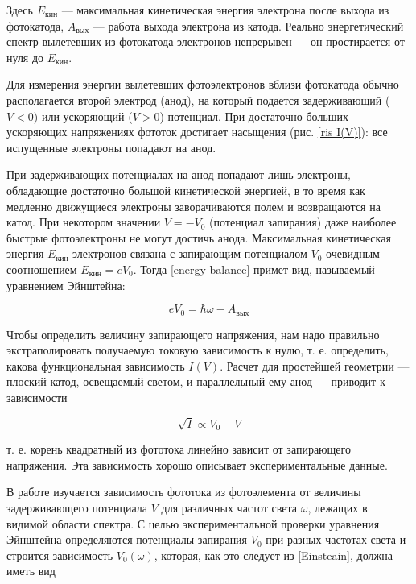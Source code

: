 \documentclass[a4paper,12pt]{article}
\theoremstyle{definition}
\begin{document}
	Здесь $E_{\text{кин}}$ ---  максимальная кинетическая энергия электрона после выхода из фотокатода, $A_{\text{вых}}$ --- работа выхода электрона из катода. Реально энергетический спектр вылетевших из фотокатода электронов непрерывен --- он простирается от нуля до $ E_{\text{кин}} $. 
	
	Для измерения энергии вылетевших фотоэлектронов вблизи фотокатода
	обычно располагается второй электрод
	(анод), на который подается задерживающий ($ V < 0 $) или ускоряющий ($ V >
	0 $) потенциал. При достаточно больших
	ускоряющих напряжениях фототок достигает насыщения (рис. \ref{ris I(V)}): все испущенные электроны попадают на анод.
	
	При задерживающих потенциалах на анод попадают лишь электроны,
	обладающие достаточно большой кинетической энергией, в то время
	как медленно движущиеся электроны заворачиваются полем и возвращаются на катод. При некотором значении $ V = -V_0 $ (потенциал запирания) даже наиболее быстрые фотоэлектроны не могут достичь
	анода.
	Максимальная кинетическая энергия $E_{\text{кин}}$ электронов связана с
	запирающим потенциалом $ V_0 $ очевидным соотношением $ E_{\text{кин}} = eV_0 $. Тогда \eqref{energy balance} примет вид, называемый уравнением Эйнштейна:
	
	\begin{equation}\label{Einsteain}
	eV_0 = \hbar\omega - A_{\text{вых}}
	\end{equation}
	
	Чтобы определить величину запирающего
	напряжения, нам надо правильно экстраполировать получаемую токовую зависимость к нулю, т. е. определить, какова функциональная
	зависимость $ I(V) $. Расчет для простейшей геометрии --- плоский катод, освещаемый светом, и параллельный ему анод --- приводит к зависимости
	
	\begin{equation}\label{sqrt I = V}
	\sqrt{I} \propto V_0 - V
	\end{equation}
	
	т. е. корень квадратный из фототока линейно
	зависит от запирающего напряжения. Эта зависимость хорошо описывает экспериментальные данные.
	
	В работе изучается зависимость фототока из фотоэлемента от величины задерживающего потенциала $ V $ для различных частот света $ \omega $, лежащих в видимой области спектра. С целью экспериментальной
	проверки уравнения Эйнштейна определяются потенциалы запирания
	$ V_0 $ при разных частотах света и строится зависимость $ V_0(\omega) $, которая, как это следует из \eqref{Einsteain}, должна иметь вид
	
\end{document}
